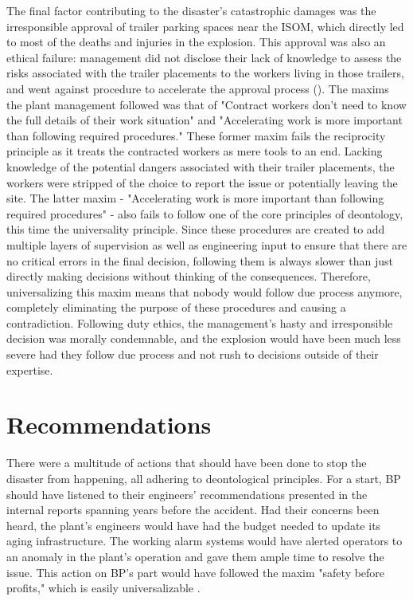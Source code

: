\documentclass[12pt]{article}
\begin{document}
	The final factor contributing to the disaster's catastrophic damages was the irresponsible approval of trailer parking spaces near the ISOM, which directly led to most of the deaths and injuries in the explosion. This approval was also an ethical failure: management did not disclose their lack of knowledge to assess the risks associated with the trailer placements to the workers living in those trailers, and went against procedure to accelerate the approval process (\cite{csbreport}). The maxims the plant management followed was that of "Contract workers don't need to know the full details of their work situation" and "Accelerating work is more important than following required procedures." These former maxim fails the reciprocity principle as it treats the contracted workers as mere tools to an end. Lacking knowledge of the potential dangers associated with their trailer placements, the workers were stripped of the choice to report the issue or potentially leaving the site. The latter maxim - "Accelerating work is more important than following required procedures"  -  also fails to follow one of the core principles of deontology, this time the universality principle. Since these procedures are created to add multiple layers of supervision as well as engineering input to ensure that there are no critical errors in the final decision, following them is always slower than just directly making decisions without thinking of the consequences. Therefore, universalizing this maxim means that nobody would follow due process anymore, completely eliminating the purpose of these procedures and causing a contradiction. Following duty ethics, the management's hasty and irresponsible decision was morally condemnable, and the explosion would have been much less severe had they follow due process and not rush to decisions outside of their expertise.
	
	\section*{Recommendations}
	There were a multitude of actions that should have been done to stop the disaster from happening, all adhering to deontological principles. For a start, BP should have listened to their engineers' recommendations presented in the internal reports spanning years before the accident. Had their concerns been heard, the plant's engineers would have had the budget needed to update its aging infrastructure. The working alarm systems would have alerted operators to an anomaly in the plant's operation and gave them ample time to resolve the issue. This action on BP's part would have followed the maxim "safety before profits," which is easily universalizable . 
	
\end{document}
